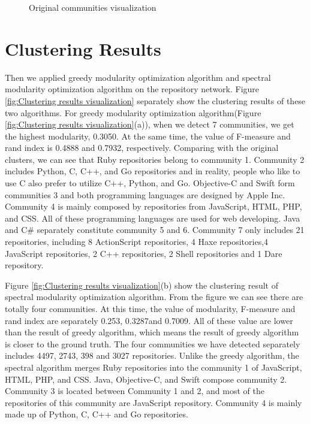 \documentclass[12pt,oneside,final]{vlsithesis}
\begin{document}
\begin{figure*}
	\centering
	\caption{Original communities visualization}
	\label{fig:Original communities visualization}
\end{figure*}
 
\section{Clustering Results}
Then we applied greedy modularity optimization algorithm and spectral modularity optimization algorithm on the repository network. Figure \ref{fig:Clustering results visualization} separately show the clustering results of these two algorithms. For greedy modularity optimization algorithm(Figure \ref{fig:Clustering results visualization}(a)), when we detect 7 communities, we get the highest modularity, 0.3050. At the same time, the value of F-measure and rand index is 0.4888 and 0.7932, respectively. Comparing with the original clusters, we can see that  Ruby repositories belong to community 1. Community 2 includes Python, C, C++, and Go repositories and in reality, people who like to use C also prefer to utilize C++, Python, and Go. Objective-C and Swift form communities 3 and both programming languages are designed by Apple Inc. Community 4 is mainly composed by repositories from JavaScript, HTML, PHP, and CSS. All of these programming languages are used for web developing. Java and C\# separately constitute community 5 and 6. Community 7 only includes 21 repositories, including 8 ActionScript repositories, 4 Haxe repositories,4 JavaScript repositories, 2 C++ repositories, 2 Shell repositories and 1 Dare repository. 

Figure \ref{fig:Clustering results visualization}(b) show the clustering result of spectral modularity optimization algorithm. From the figure we can see there are totally four communities. At this time, the value of modularity, F-measure and rand index are separately 0.253, 0.3287and 0.7009. All of these value are lower than the result of greedy algorithm, which means the result of greedy algorithm is closer to the ground truth. The four communities we have detected separately includes 4497, 2743, 398
and 3027 repositories. Unlike the greedy algorithm, the spectral algorithm merges Ruby repositories into the community 1 of JavaScript, HTML, PHP, and CSS. Java, Objective-C, and Swift compose community 2. Community 3 is located between Community 1 and 2, and most of the repositories of this community are JavaScript repository. Community 4 is mainly made up of Python, C, C++ and Go repositories. 
\end{document}
